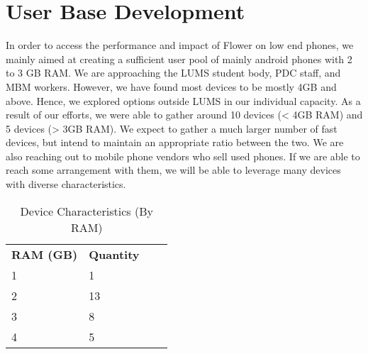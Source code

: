\section{User Base Development}
In order to access the performance and impact of Flower on low end phones, we mainly aimed at creating a sufficient user pool of mainly android phones with 2 to 3 GB RAM. We are approaching the LUMS student body, PDC staff, and MBM workers. However, we have found most devices to be mostly 4GB and above. Hence, we explored options outside LUMS in our individual capacity. As a result of our efforts, we were able to gather around 10 devices (< 4GB RAM) and 5 devices (> 3GB RAM). We expect to gather a much larger number of fast devices, but intend to maintain an appropriate ratio between the two. We are also reaching out to mobile phone vendors who sell used phones. If we are able to reach some arrangement with them, we will be able to leverage many devices with diverse characteristics. \\

\begin{table}[]
    \begin{tabular}{llll}
    \textbf{RAM (GB)}  & \textbf{Quantity} \\ 
    1                               & 1        \\
    2                               & 13        \\
    3                               & 8        \\
    4                               & 5        \\

    \end{tabular}
    \caption{Device Characteristics (By RAM)} 
\end{table}